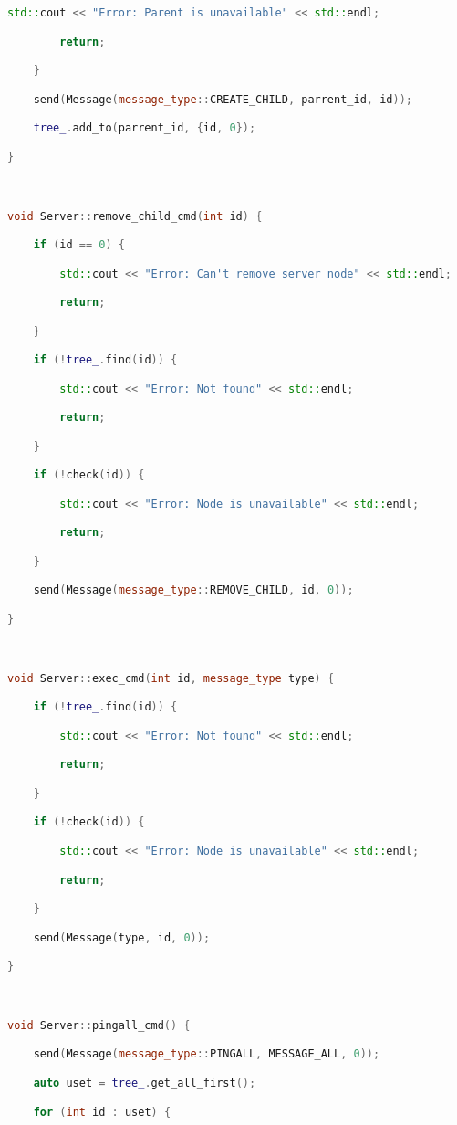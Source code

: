 \begin{lstlisting}[language=C++]
        std::cout << "Error: Parent is unavailable" << std::endl;

        return;

    }

    send(Message(message_type::CREATE_CHILD, parrent_id, id));

    tree_.add_to(parrent_id, {id, 0});

}



void Server::remove_child_cmd(int id) {

    if (id == 0) {

        std::cout << "Error: Can't remove server node" << std::endl;

        return;

    }

    if (!tree_.find(id)) {

        std::cout << "Error: Not found" << std::endl;

        return;

    }

    if (!check(id)) {

        std::cout << "Error: Node is unavailable" << std::endl;

        return;

    }

    send(Message(message_type::REMOVE_CHILD, id, 0));

}



void Server::exec_cmd(int id, message_type type) {

    if (!tree_.find(id)) {

        std::cout << "Error: Not found" << std::endl;

        return;

    }

    if (!check(id)) {

        std::cout << "Error: Node is unavailable" << std::endl;

        return;

    }

    send(Message(type, id, 0));

}



void Server::pingall_cmd() {

    send(Message(message_type::PINGALL, MESSAGE_ALL, 0));

    auto uset = tree_.get_all_first();

    for (int id : uset) {


\end{lstlisting}
